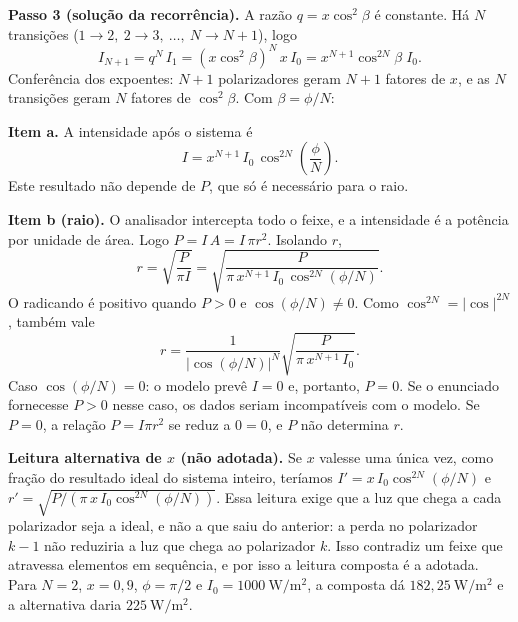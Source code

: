 \documentclass{article}%
\begin{document}
\textbf{Passo 3 (solução da recorrência).} A razão $q=x\cos^2\beta$ é constante. Há $N$ transições ($1\to 2,\ 2\to 3,\ \dots,\ N\to N+1$), logo
\[
I_{N+1}=q^{N}\,I_1=(x\cos^2\beta)^N\,x\,I_0 = x^{N+1}\cos^{2N}\beta\; I_0 .
\]
Conferência dos expoentes: $N+1$ polarizadores geram $N+1$ fatores de $x$, e as $N$ transições geram $N$ fatores de $\cos^2\beta$. Com $\beta=\phi/N$:

\textbf{Item a.} A intensidade após o sistema é
\[
I = x^{N+1}\, I_0\, \cos^{2N}\!\left(\frac{\phi}{N}\right).
\]
Este resultado não depende de $P$, que só é necessário para o raio.

\textbf{Item b (raio).} O analisador intercepta todo o feixe, e a intensidade é a potência por unidade de área. Logo $P=I\,A=I\,\pi r^2$. Isolando $r$,
\[
r=\sqrt{\frac{P}{\pi I}}=\sqrt{\frac{P}{\pi\,x^{N+1}\,I_0\,\cos^{2N}(\phi/N)}} .
\]
O radicando é positivo quando $P>0$ e $\cos(\phi/N)\neq 0$. Como $\cos^{2N}=|\cos|^{2N}$, também vale
\[
r=\frac{1}{|\cos(\phi/N)|^{N}}\sqrt{\frac{P}{\pi\,x^{N+1}\,I_0}} .
\]
Caso $\cos(\phi/N)=0$: o modelo prevê $I=0$ e, portanto, $P=0$. Se o enunciado fornecesse $P>0$ nesse caso, os dados seriam incompatíveis com o modelo. Se $P=0$, a relação $P=I\pi r^2$ se reduz a $0=0$, e $P$ não determina $r$.

\textbf{Leitura alternativa de $x$ (não adotada).} Se $x$ valesse uma única vez, como fração do resultado ideal do sistema inteiro, teríamos $I'=x\,I_0\cos^{2N}(\phi/N)$ e $r'=\sqrt{P/(\pi\,x\,I_0\cos^{2N}(\phi/N))}$. Essa leitura exige que a luz que chega a cada polarizador seja a ideal, e não a que saiu do anterior: a perda no polarizador $k-1$ não reduziria a luz que chega ao polarizador $k$. Isso contradiz um feixe que atravessa elementos em sequência, e por isso a leitura composta é a adotada. Para $N=2$, $x=0{,}9$, $\phi=\pi/2$ e $I_0=1000\ \mathrm{W/m^2}$, a composta dá $182{,}25\ \mathrm{W/m^2}$ e a alternativa daria $225\ \mathrm{W/m^2}$.
\end{document}
